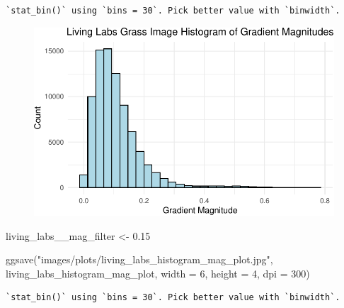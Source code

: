 \documentclass[
  letterpaper,
]{report}
\newenvironment{Shaded}{\begin{snugshade}}{\end{snugshade}}
\newcommand{\AttributeTok}[1]{\textcolor[rgb]{0.40,0.45,0.13}{#1}}
\newcommand{\DecValTok}[1]{\textcolor[rgb]{0.68,0.00,0.00}{#1}}
\newcommand{\FloatTok}[1]{\textcolor[rgb]{0.68,0.00,0.00}{#1}}
\newcommand{\FunctionTok}[1]{\textcolor[rgb]{0.28,0.35,0.67}{#1}}
\newcommand{\NormalTok}[1]{\textcolor[rgb]{0.00,0.23,0.31}{#1}}
\newcommand{\OtherTok}[1]{\textcolor[rgb]{0.00,0.23,0.31}{#1}}
\newcommand{\StringTok}[1]{\textcolor[rgb]{0.13,0.47,0.30}{#1}}
\begin{document}
\begin{verbatim}
`stat_bin()` using `bins = 30`. Pick better value with `binwidth`.
\end{verbatim}

\begin{figure}[H]

{\centering \includegraphics{results_files/figure-pdf/unnamed-chunk-12-1.pdf}

}

\end{figure}

\begin{Shaded}
\begin{Highlighting}[]
\NormalTok{living\_labs\_\_mag\_filter }\OtherTok{\textless{}{-}} \FloatTok{0.15}

\FunctionTok{ggsave}\NormalTok{(}\StringTok{"images/plots/living\_labs\_histogram\_mag\_plot.jpg"}\NormalTok{, living\_labs\_histogram\_mag\_plot, }\AttributeTok{width =} \DecValTok{6}\NormalTok{, }\AttributeTok{height =} \DecValTok{4}\NormalTok{, }\AttributeTok{dpi =} \DecValTok{300}\NormalTok{)}
\end{Highlighting}
\end{Shaded}

\begin{verbatim}
`stat_bin()` using `bins = 30`. Pick better value with `binwidth`.
\end{verbatim}
\end{document}
